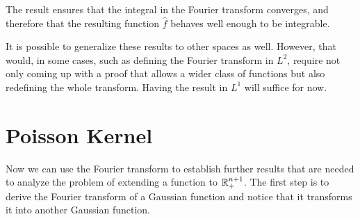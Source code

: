 The result ensures that the integral in the Fourier transform converges, and therefore that the resulting function $\hat{f}$ behaves well enough to be integrable.  

It is possible to generalize these results to other spaces as well. However, that would, in some cases, such as defining the Fourier transform in $L^2$, require not only coming up with a proof that allows a wider class of functions but also redefining the whole transform. Having the result in $L^1$ will suffice for now.

\section{Poisson Kernel}

Now we can use the Fourier transform to establish further results that are needed to analyze the problem of extending a function to $\mathbb R_+^ {n+1}$. The first step is to derive the Fourier transform of a Gaussian function and notice that it transforms it into another Gaussian function.

